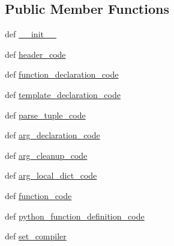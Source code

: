\subsection*{Public Member Functions}
\begin{DoxyCompactItemize}
\item 
def \hyperlink{classscipy_1_1weave_1_1ext__tools_1_1ext__function__from__specs_adc6693190f6e04a2f3ea5d9557401174}{\+\_\+\+\_\+init\+\_\+\+\_\+}
\item 
def \hyperlink{classscipy_1_1weave_1_1ext__tools_1_1ext__function__from__specs_a19fed9cb2788e5d07ed3a7b12f805630}{header\+\_\+code}
\item 
def \hyperlink{classscipy_1_1weave_1_1ext__tools_1_1ext__function__from__specs_af4e11e8c420cd579af80dcca2f761106}{function\+\_\+declaration\+\_\+code}
\item 
def \hyperlink{classscipy_1_1weave_1_1ext__tools_1_1ext__function__from__specs_a1d55b22e8bc82ea4f30bb94db9348640}{template\+\_\+declaration\+\_\+code}
\item 
def \hyperlink{classscipy_1_1weave_1_1ext__tools_1_1ext__function__from__specs_a085b827b4481b970e6232c6befd4607a}{parse\+\_\+tuple\+\_\+code}
\item 
def \hyperlink{classscipy_1_1weave_1_1ext__tools_1_1ext__function__from__specs_a8b8955c3d037af9dce77ea221c7c7864}{arg\+\_\+declaration\+\_\+code}
\item 
def \hyperlink{classscipy_1_1weave_1_1ext__tools_1_1ext__function__from__specs_ac96d88928cc72d25397df0b737d7e27d}{arg\+\_\+cleanup\+\_\+code}
\item 
def \hyperlink{classscipy_1_1weave_1_1ext__tools_1_1ext__function__from__specs_a6f64b6945316698027a88ae3d1761d8a}{arg\+\_\+local\+\_\+dict\+\_\+code}
\item 
def \hyperlink{classscipy_1_1weave_1_1ext__tools_1_1ext__function__from__specs_afaadb2cbfd2de05ecd0e4f99542b2fd2}{function\+\_\+code}
\item 
def \hyperlink{classscipy_1_1weave_1_1ext__tools_1_1ext__function__from__specs_a365d5d021ad8fe80b1c3b61ed1bb88a6}{python\+\_\+function\+\_\+definition\+\_\+code}
\item 
def \hyperlink{classscipy_1_1weave_1_1ext__tools_1_1ext__function__from__specs_aee06b34eeabe80228eced68d8df5f65d}{set\+\_\+compiler}
\end{DoxyCompactItemize}
